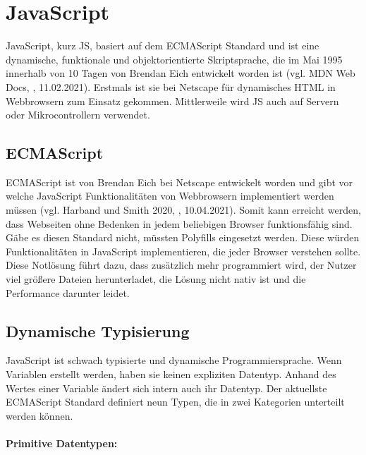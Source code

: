 \newpage
\section{JavaScript}
JavaScript, kurz JS, basiert auf dem ECMAScript Standard und ist eine dynamische, funktionale und objektorientierte Skriptsprache, die im Mai 1995 innerhalb von 10 Tagen von Brendan Eich entwickelt worden ist (vgl. MDN Web Docs, \cite{javascript_2021}, 11.02.2021). Erstmals ist sie bei Netscape für dynamisches HTML in Webbrowsern zum Einsatz gekommen. Mittlerweile wird JS auch auf Servern oder Mikrocontrollern verwendet.

\subsection{ECMAScript}
ECMAScript ist von Brendan Eich bei Netscape entwickelt worden und gibt vor welche JavaScript Funktionalitäten von Webbrowsern implementiert werden müssen (vgl. Harband und Smith 2020, \cite{ecma_2020}, 10.04.2021). Somit kann erreicht werden, dass Webseiten ohne Bedenken in jedem beliebigen Browser funktionsfähig sind. Gäbe es diesen Standard nicht, müssten Polyfills eingesetzt werden. Diese würden Funktionalitäten in JavaScript implementieren, die jeder Browser verstehen sollte. Diese Notlösung führt dazu, dass zusätzlich mehr programmiert wird, der Nutzer viel größere Dateien herunterladet, die Lösung nicht nativ ist und die Performance darunter leidet. 

\subsection{Dynamische Typisierung}
JavaScript ist schwach typisierte und dynamische Programmiersprache. Wenn Variablen erstellt werden, haben sie keinen expliziten Datentyp. Anhand des Wertes einer Variable ändert sich intern auch ihr Datentyp. Der aktuellste ECMAScript Standard definiert neun Typen, die in zwei Kategorien unterteilt werden können.

\paragraph{Primitive Datentypen:}

